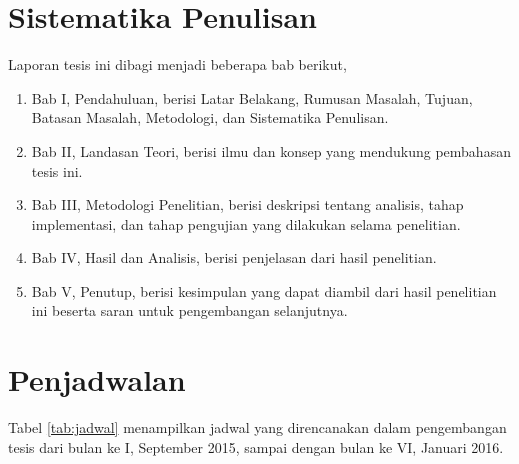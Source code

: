 \documentclass[12pt,a4paper,titlepage]{article}
\begin{document}
\section{Sistematika Penulisan}\label{sec:sistematika-penulisan}

Laporan tesis ini dibagi menjadi beberapa bab berikut,
\begin{enumerate}
	\item Bab I, Pendahuluan, berisi Latar Belakang, Rumusan Masalah, Tujuan, Batasan Masalah, Metodologi, dan Sistematika Penulisan.
	\item Bab II, Landasan Teori, berisi ilmu dan konsep yang mendukung pembahasan tesis ini.
	\item Bab III, Metodologi Penelitian, berisi deskripsi tentang analisis, tahap implementasi, dan tahap pengujian yang dilakukan selama penelitian.
	\item Bab IV, Hasil dan Analisis, berisi penjelasan dari hasil penelitian.
	\item Bab V, Penutup, berisi kesimpulan yang dapat diambil dari hasil penelitian ini beserta saran untuk pengembangan selanjutnya.
\end{enumerate}

\clearpage
\section{Penjadwalan}\label{sec:penjadwalan}

Tabel \ref{tab:jadwal} menampilkan jadwal yang direncanakan dalam pengembangan tesis dari bulan ke I, September 2015, sampai dengan bulan ke VI, Januari 2016.

\renewcommand{\arraystretch}{1.5}
\setlength{\tabcolsep}{3pt}
\newcommand{\tand}{&}
\newcommand{\fillcell}[1]{%
	\forloop{cnt}{0}{\value{cnt}<#1}{%
		{\cellcolor[gray]{0.7}} \tand
	}%
}
\newcommand{\emptycell}[2]{%
	\forloop{cnt}{0}{\value{cnt}<#1}{%
		\tand
	}%
	\ifthenelse{#2 = 1}{\\}{\tand}%
}
\end{document}
